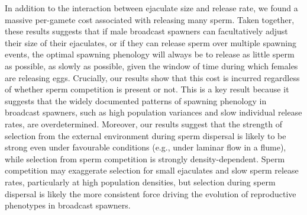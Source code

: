 \documentclass{article}
\begin{document}
In addition to the interaction between ejaculate size and release rate, we found a massive per-gamete cost associated with releasing many sperm. Taken together, these results suggests that if male broadcast spawners can facultatively adjust their size of their ejaculates, or if they can release sperm over multiple spawning events, the optimal spawning phenology will always be to release as little sperm as possible, as slowly as possible, given the window of time during which females are releasing eggs. Crucially, our results show that this cost is incurred regardless of whether sperm competition is present or not. This is a key result because it suggests that the widely documented patterns of spawning phenology in broadcast spawners, such as high population variances and slow individual release rates, are overdetermined. Moreover, our results suggest that the strength of selection from the external environment during sperm dispersal is likely to be strong even under favourable conditions (e.g., under laminar flow in a flume), while selection from sperm competition is strongly density-dependent. Sperm competition may exaggerate selection for small ejaculates and slow sperm release rates, particularly at high population densities, but selection during sperm dispersal is likely the more consistent force driving the evolution of reproductive phenotypes in broadcast spawners.




\end{document}
